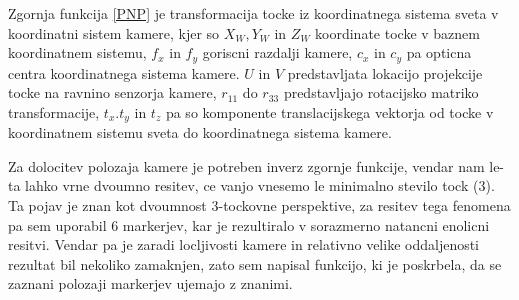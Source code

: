 \documentclass[a4paper,twoside,openright,12pt,slovene]{book}
\begin{document}
Zgornja funkcija \ref{PNP} je transformacija tocke iz koordinatnega sistema sveta v koordinatni sistem kamere, kjer so \begin{math} X_W, Y_W \end{math} in \begin{math} Z_W\end{math} koordinate tocke v baznem koordinatnem sistemu, \begin{math} f_x \end{math} in \begin{math} f_y \end{math} goriscni razdalji kamere, \begin{math} c_x \end{math} in \begin{math} c_y \end{math} pa opticna centra koordinatnega sistema kamere. \begin{math} U \end{math} in \begin{math} V \end{math} predstavljata lokacijo projekcije tocke na ravnino senzorja kamere, \begin{math} r_11 \end{math} do \begin{math} r_33 \end{math} predstavljajo rotacijsko matriko transformacije, \begin{math} t_x. t_y \end{math} in \begin{math} t_z \end{math} pa so komponente translacijskega vektorja od tocke v koordinatnem sistemu sveta do koordinatnega sistema kamere.

Za dolocitev polozaja kamere je potreben inverz zgornje funkcije, vendar nam le-ta lahko vrne dvoumno resitev, ce vanjo vnesemo le minimalno stevilo tock (3). Ta pojav je znan kot dvoumnost 3-tockovne perspektive, za resitev tega fenomena pa sem uporabil 6 markerjev, kar je rezultiralo v sorazmerno natancni enolicni resitvi. Vendar pa je zaradi locljivosti kamere in relativno velike oddaljenosti rezultat bil nekoliko zamaknjen, zato sem napisal funkcijo, ki je poskrbela, da se zaznani polozaji markerjev ujemajo z znanimi.
\end{document}
